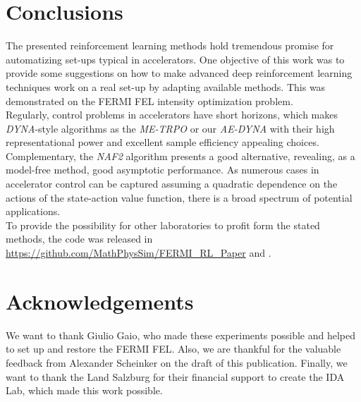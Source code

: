 \documentclass[
reprint,nofootinbib,
amsmath,amssymb,amsfonts,clevref,
aps,
prstab,
]{revtex4-2}
\begin{document}
	\section{Conclusions}
	The presented reinforcement learning methods hold tremendous promise for automatizing set-ups typical in accelerators. One objective of this work was to provide some suggestions on how to make advanced deep reinforcement learning techniques work on a real set-up by adapting available methods. This was demonstrated on the FERMI FEL intensity optimization problem.\\
	Regularly, control problems in accelerators have short horizons, which makes \emph{DYNA}-style algorithms as the \emph{ME-TRPO} or our \emph{AE-DYNA} with their high representational power and excellent sample efficiency appealing choices.\\
	Complementary, the \emph{NAF2} algorithm presents a good alternative, revealing, as a model-free method, good asymptotic performance. As numerous cases in accelerator control can be captured assuming a quadratic dependence on the actions of the state-action value function, there is a broad spectrum of potential applications.\\
	To provide the possibility for other laboratories to profit form the stated methods, the code was released in \url{https://github.com/MathPhysSim/FERMI_RL_Paper} and \cite{Hirlaender2020b}.
	
	\section{Acknowledgements}
	We want to thank Giulio Gaio, who made these experiments possible and helped to set up and restore the FERMI FEL. Also, we are thankful for the valuable feedback from Alexander Scheinker on the draft of this publication. Finally, we want to thank the Land Salzburg for their financial support to create the IDA Lab, which made this work possible.
	
	\appendix
\end{document}
